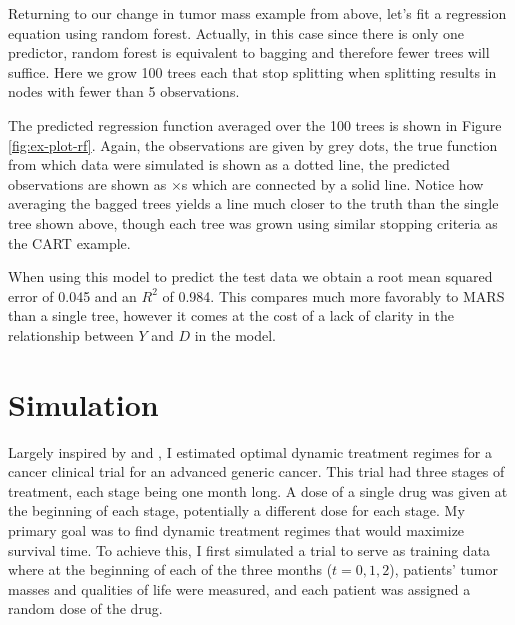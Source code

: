 \documentclass[12pt]{article}
\begin{document}
Returning to our change in tumor mass example from above, let's fit a regression equation using random forest. Actually, in this case since there is only one predictor, random forest is equivalent to bagging and therefore fewer trees will suffice. Here we grow 100 trees each that stop splitting when splitting results in nodes with fewer than 5 observations.

The predicted regression function averaged over the 100 trees is shown in Figure \ref{fig:ex-plot-rf}. Again, the observations are given by grey dots, the true function from which data were simulated is shown as a dotted line, the predicted observations are shown as $\times$s which are connected by a solid line. Notice how averaging the bagged trees yields a line much closer to the truth than the single tree shown above, though each tree was grown using similar stopping criteria as the CART example.

When using this model to predict the test data we obtain a root mean squared error of 0.045 and an $R^2$ of 0.984. This compares much more favorably to MARS than a single tree, however it comes at the cost of a lack of clarity in the relationship between $Y$ and $D$ in the model.




\section{Simulation} %
\label{sec:simulation}

Largely inspired by \textcite{crt} and \textcite{nsclc}, I estimated optimal dynamic treatment regimes for a cancer clinical trial for an advanced generic cancer. This trial had three stages of treatment, each stage being one month long. A dose of a single drug was given at the beginning of each stage, potentially a different dose for each stage. My primary goal was to find dynamic treatment regimes that would maximize survival time. To achieve this, I first simulated a trial to serve as training data where at the beginning of each of the three months ($t = 0, 1, 2$), patients' tumor masses and qualities of life were measured, and each patient was assigned a random dose of the drug.
\end{document}

